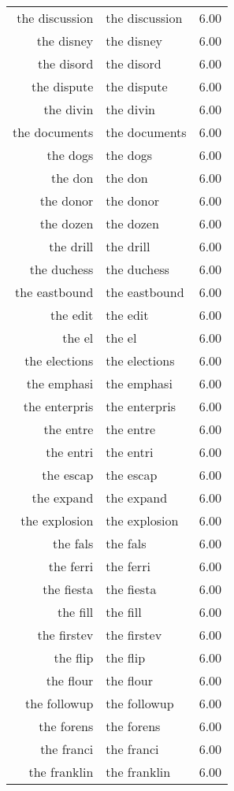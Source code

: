 \begin{table}[ht]
\begin{tabular}{rlr}
  the discussion & the discussion & 6.00 \\ 
  the disney & the disney & 6.00 \\ 
  the disord & the disord & 6.00 \\ 
  the dispute & the dispute & 6.00 \\ 
  the divin & the divin & 6.00 \\ 
  the documents & the documents & 6.00 \\ 
  the dogs & the dogs & 6.00 \\ 
  the don & the don & 6.00 \\ 
  the donor & the donor & 6.00 \\ 
  the dozen & the dozen & 6.00 \\ 
  the drill & the drill & 6.00 \\ 
  the duchess & the duchess & 6.00 \\ 
  the eastbound & the eastbound & 6.00 \\ 
  the edit & the edit & 6.00 \\ 
  the el & the el & 6.00 \\ 
  the elections & the elections & 6.00 \\ 
  the emphasi & the emphasi & 6.00 \\ 
  the enterpris & the enterpris & 6.00 \\ 
  the entre & the entre & 6.00 \\ 
  the entri & the entri & 6.00 \\ 
  the escap & the escap & 6.00 \\ 
  the expand & the expand & 6.00 \\ 
  the explosion & the explosion & 6.00 \\ 
  the fals & the fals & 6.00 \\ 
  the ferri & the ferri & 6.00 \\ 
  the fiesta & the fiesta & 6.00 \\ 
  the fill & the fill & 6.00 \\ 
  the firstev & the firstev & 6.00 \\ 
  the flip & the flip & 6.00 \\ 
  the flour & the flour & 6.00 \\ 
  the followup & the followup & 6.00 \\ 
  the forens & the forens & 6.00 \\ 
  the franci & the franci & 6.00 \\ 
  the franklin & the franklin & 6.00 \\ 

\end{tabular}
\end{table}
